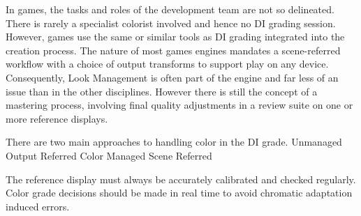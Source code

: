 In games, the tasks and roles of the development team are not so delineated. There is rarely a specialist colorist involved and hence no DI grading session. However, games use the same or similar tools as DI grading integrated into the creation process. The nature of most games engines mandates a scene-referred workflow with a choice of output transforms to support play on any device. Consequently, Look Management is often part of the engine and far less of an issue than in the other disciplines. However there is still the concept of a mastering process, involving final quality adjustments in a review suite on one or more reference displays.

There are two main approaches to handling color in the DI grade.
Unmanaged Output Referred
Color Managed Scene Referred

The reference display must always be accurately calibrated and checked regularly. Color grade decisions should be made in real time to avoid chromatic adaptation induced errors.

